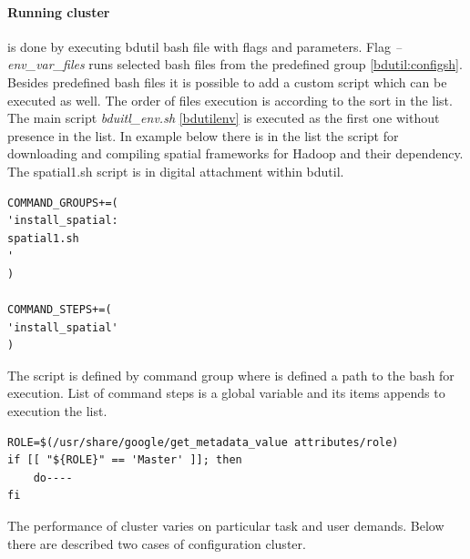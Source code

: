 \documentclass[a4paper,12pt,oneside]{report}
\begin{document}
    \paragraph{Running cluster}\label{runcluster} is done by executing bdutil bash
    file with flags and parameters.  Flag \textit{--env\_var\_files} runs selected bash files from the 
    predefined group \ref{bdutil:configsh}. Besides predefined bash files it is possible to add a custom
    script which can be executed as well. The  order of files execution is according to the sort in the list. 
    The main script    \textit{bduitl\_env.sh} \ref{bdutilenv} is executed as the first one without presence 
    in the list. In example below there is in the list the script for downloading and compiling spatial frameworks for 
    Hadoop and their dependency. The spatial1.sh script is in digital attachment within bdutil.
	\begin{footnotesize}
		\begin{lstlisting}[style=python]
COMMAND_GROUPS+=(
'install_spatial:
spatial1.sh
'
)

COMMAND_STEPS+=(
'install_spatial'
)
		\end{lstlisting}
	\end{footnotesize}
	The script is defined by command group where is defined a path to the bash for execution.
	List of command steps is a global variable and its items appends to execution the list.
	\begin{footnotesize}
		\begin{lstlisting}[style=python]
ROLE=$(/usr/share/google/get_metadata_value attributes/role)
if [[ "${ROLE}" == 'Master' ]]; then 
	do----
fi
		\end{lstlisting}
	\end{footnotesize}

The performance of cluster varies on particular task and user demands. 
Below there are described two cases of configuration cluster.
	
\end{document}
